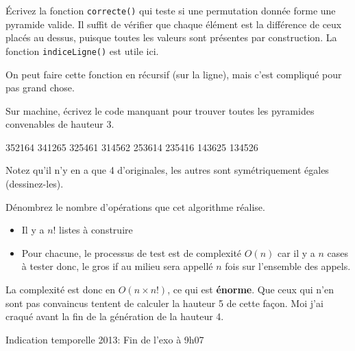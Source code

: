 \documentclass[10pt]{article}\usepackage[correction,nu]{esial}
\begin{document}
\begin{Question}
  Écrivez la fonction \texttt{correcte()} qui teste si une permutation donnée
  forme une pyramide valide. Il suffit de vérifier que chaque élément est la
  différence de ceux placés au dessus, puisque toutes les valeurs sont présentes
  par construction. La fonction \texttt{indiceLigne()} est utile ici.
\end{Question}
\begin{Reponse}
  On peut faire cette fonction en récursif (sur la ligne), mais c'est compliqué
  pour pas grand chose.

  \newcommand*\FancyVerbStopString{// END CORRECTE}
  \newcommand*\FancyVerbStartString{// BEGIN CORRECTE}
\end{Reponse}
\begin{Question}
  Sur machine, écrivez le code manquant pour trouver toutes les pyramides
  convenables de hauteur 3.
\end{Question}
\begin{Reponse}
  352164 341265 325461 314562 253614 235416 143625 134526

  Notez qu'il n'y en a que 4 d'originales, les autres sont symétriquement
  égales (dessinez-les). 
\end{Reponse}

\begin{Question}
  Dénombrez le nombre d'opérations que cet algorithme réalise.
\end{Question}
\begin{Reponse}
  \begin{itemize}
  \item Il y a $n!$ listes à construire
  \item Pour chacune, le processus de test est de complexité $O(n)$ car il y a
    $n$ cases à tester donc, le gros if au milieu sera appellé $n$ fois sur
    l'ensemble des appels.
  \end{itemize}
  La complexité est donc en $O(n\times n!)$, ce qui est \textbf{énorme}. Que
  ceux qui n'en sont pas convaincus tentent de calculer la hauteur 5 de cette
  façon. Moi j'ai craqué avant la fin de la génération de la hauteur 4.

  Indication temporelle 2013: Fin de l'exo à 9h07
\end{Reponse}
\end{document}

